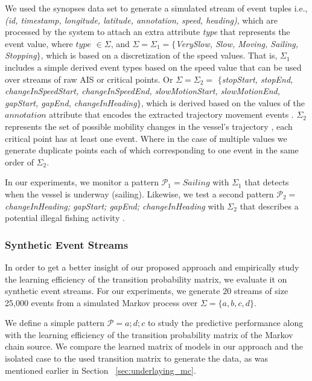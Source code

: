 \par We used the synopses data set to generate a simulated stream of event tuples  i.e., \textit{(id, timestamp, longitude, latitude, annotation, speed, heading)}, which are processed by the system to attach an extra attribute \textit{type} that represents the event value,  where $type$ $\in \Sigma$,  and $ \Sigma= \Sigma_1=$$\{$\textit{VerySlow, Slow, Moving,  Sailing, Stopping}$\}$, which is based on a discretization of the speed values. That is, $\Sigma_1$ includes a simple derived event types based on the speed value that can be used over streams of  raw AIS  or critical points. Or $\Sigma=\Sigma_2=$ $\{$\textit{stopStart, stopEnd, changeInSpeedStart, changeInSpeedEnd,  slowMotionStart, slowMotionEnd, gapStart, gapEnd, changeInHeading}$\}$, which is derived based on the values of the $annotation$ attribute that encodes the extracted trajectory movement events \cite{synopses1}. $\Sigma_2$ represents the set of possible mobility changes in the vessel's trajectory \cite{synopses1}, each critical point has at least one event. Where in the case of multiple values we generate duplicate points each of which corresponding to one event in the same order of $\Sigma_2$.

\par In our experiments, we monitor a pattern $\mathcal{P}_1=Sailing$ with $\Sigma_1$ that detects when the vessel is underway (sailing). Likewise, we test a second pattern  $\mathcal{P}_2=$\textit{changeInHeading; gapStart; gapEnd; changeInHeading} with $\Sigma_2$ that describes a potential illegal fishing activity \cite{alevizos2017event}. 


\subsubsection*{Synthetic Event Streams}

\par In order to get a better insight of our proposed approach and empirically study the learning efficiency of the transition probability matrix, we evaluate it on synthetic event streams. For our experiments, we generate $20$ streams of size 25,000 events from a simulated Markov process over $\Sigma=\{a, b, c, d\}$.

\par We define a simple pattern $\mathcal{P}=a ; d ; c$ to study the predictive performance along with the learning efficiency of the transition probability matrix of the Markov chain source.  We compare the learned matrix of \pmcmr models in our approach and the isolated case to the used transition matrix to generate the data, as was mentioned earlier in Section ~\ref{sec:underlaying_mc}.
   


